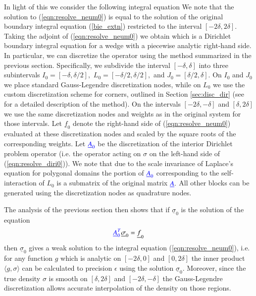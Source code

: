 In light of this we consider the following integral equation
We note that the solution to (\ref{eqn:resolve_neum0}) is equal to the solution of the original boundary integral equation (\ref{bie_extn}) restricted to the interval $[-2\delta,2\delta].$ Taking the adjoint of (\ref{eqn:resolve_neum0}) we obtain
which is a Dirichlet boundary integral equation for a wedge with a piecewise analytic right-hand side. In particular, we can discretize the operator using the method summarized in the previous section. Specifically, we subdivide the interval $[-\delta,\delta]$ into three subintervals $I_0 = [-\delta,\delta/2],$ $L_0 = [-\delta/2,\delta/2],$ and $J_0 = [\delta/2,\delta].$ On $I_0$ and $J_0$ we place standard Gauss-Legendre discretization nodes, while on $L_0$ we use the custom discretization scheme for corners, outlined in Section \ref{sec:disc_dir} (see \cite{hoskins2019numerical} for a detailed description of the method). On the intervals $[-2\delta,-\delta]$ and $[\delta,2\delta]$ we use the same discretization nodes and weights as in the original system for those intervals. Let $\underline{f}_0$ denote the right-hand side of (\ref{eqn:resolve_neum0}) evaluated at these discretization nodes and scaled by the square roots of the corresponding weights. Let ${\color{blue} \underline{A}_0}$ be the discretization of the interior Dirichlet problem operator (i.e. the operator acting on $\sigma$ on the left-hand side of (\ref{eqn:resolve_diri0})). We note that due to the scale invariance of Laplace's equation for polygonal domains the portion of ${\color{blue} \underline{A}_0}$ corresponding to the self-interaction of $L_0$ is a submatrix of the original matrix ${\color{blue} \underline{A}}.$ All other blocks can be generated using the discretization nodes as quadrature nodes.

The analysis of the previous section then shows that if $\underline{\sigma}_0$ is the solution of the equation
\begin{align}\label{eqn_reduced}
{\color{blue} \underline{A}_0^T} \underline{\sigma}_0 = \underline{f}_0
\end{align}
then $\underline{\sigma}_0$ gives a {weak solution} to the integral equation (\ref{eqn:resolve_neum0}), i.e. for any function $g$ which is analytic on $[-2\delta,0]$ and $[0,2\delta]$ the inner product $\langle g,\sigma \rangle$ can be calculated to precision $\epsilon$ using the solution $\underline{\sigma}_0.$ Moreover, since the true density $\sigma$ is smooth on $[\delta,2\delta]$ and $[-2\delta,-\delta]$ the Gauss-Legendre discretization allows accurate interpolation of the density on those regions.

